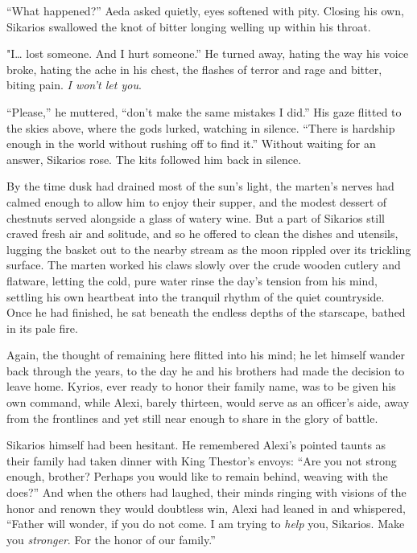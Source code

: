 ``What happened?'' Aeda asked quietly, eyes softened with pity. Closing his own, Sikarios swallowed the knot of bitter longing welling up within his throat.

"I\ldots{} lost someone. And I hurt someone.'' He turned away, hating the way his voice broke, hating the ache in his chest, the flashes of terror and rage and bitter, biting pain. \emph{I won't let you}.

``Please,'' he muttered, ``don't make the same mistakes I did.'' His gaze flitted to the skies above, where the gods lurked, watching in silence. ``There is hardship enough in the world without rushing off to find it.'' Without waiting for an answer, Sikarios rose. The kits followed him back in silence.

\secdiv

By the time dusk had drained most of the sun's light, the marten's nerves had calmed enough to allow him to enjoy their supper, and the modest dessert of chestnuts served alongside a glass of watery wine. But a part of Sikarios still craved fresh air and solitude, and so he offered to clean the dishes and utensils, lugging the basket out to the nearby stream as the moon rippled over its trickling surface. The marten worked his claws slowly over the crude wooden cutlery and flatware, letting the cold, pure water rinse the day's tension from his mind, settling his own heartbeat into the tranquil rhythm of the quiet countryside. Once he had finished, he sat beneath the endless depths of the starscape, bathed in its pale fire.

Again, the thought of remaining here flitted into his mind; he let himself wander back through the years, to the day he and his brothers had made the decision to leave home. Kyrios, ever ready to honor their family name, was to be given his own command, while Alexi, barely thirteen, would serve as an officer's aide, away from the frontlines and yet still near enough to share in the glory of battle.

Sikarios himself had been hesitant. He remembered Alexi's pointed taunts as their family had taken dinner with King Thestor's envoys: ``Are you not strong enough, brother? Perhaps you would like to remain behind, weaving with the does?'' And when the others had laughed, their minds ringing with visions of the honor and renown they would doubtless win, Alexi had leaned in and whispered, ``Father will wonder, if you do not come. I am trying to \emph{help} you, Sikarios. Make you \emph{stronger}. For the honor of our family.''

